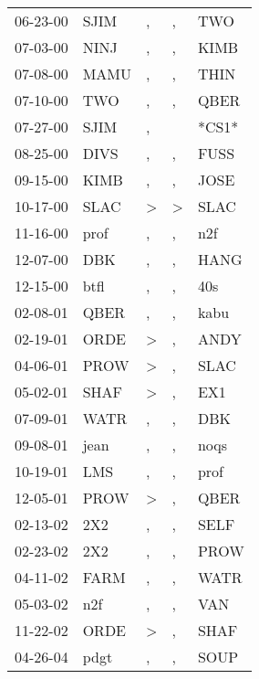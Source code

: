 \begin{supertabular}{lllll}
 06-23-00 &   SJIM &             , &             , &    TWO \\
 07-03-00 &   NINJ &             , &             , &   KIMB \\
 07-08-00 &   MAMU &             , &             , &   THIN \\
 07-10-00 &    TWO &             , &             , &   QBER \\
 07-27-00 &   SJIM &             , &               &  *CS1* \\
 08-25-00 &   DIVS &             , &             , &   FUSS \\
 09-15-00 &   KIMB &             , &             , &   JOSE \\
 10-17-00 &   SLAC &  \textgreater &  \textgreater &   SLAC \\
 11-16-00 &   prof &             , &             , &    n2f \\
 12-07-00 &    DBK &             , &             , &   HANG \\
 12-15-00 &   btfl &             , &             , &    40s \\
 02-08-01 &   QBER &             , &             , &   kabu \\
 02-19-01 &   ORDE &  \textgreater &             , &   ANDY \\
 04-06-01 &   PROW &  \textgreater &             , &   SLAC \\
 05-02-01 &   SHAF &  \textgreater &             , &    EX1 \\
 07-09-01 &   WATR &             , &             , &    DBK \\
 09-08-01 &   jean &             , &             , &   noqs \\
 10-19-01 &    LMS &             , &             , &   prof \\
 12-05-01 &   PROW &  \textgreater &             , &   QBER \\
 02-13-02 &    2X2 &             , &             , &   SELF \\
 02-23-02 &    2X2 &             , &             , &   PROW \\
 04-11-02 &   FARM &             , &             , &   WATR \\
 05-03-02 &    n2f &             , &             , &    VAN \\
 11-22-02 &   ORDE &  \textgreater &             , &   SHAF \\
 04-26-04 &   pdgt &             , &             , &   SOUP \\

\end{supertabular}

